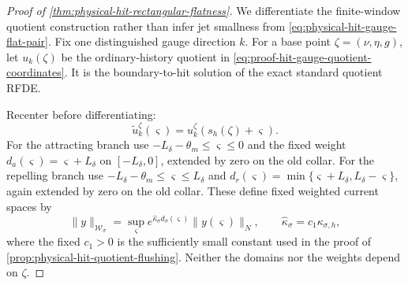 \begin{proof}[Proof of
\cref{thm:physical-hit-rectangular-flatness}]
We differentiate the finite-window quotient construction rather than infer
jet smallness from \cref{eq:physical-hit-gauge-flat-pair}.  Fix one
distinguished gauge direction $k$.  For a base point
\(\zeta=(\nu,\eta,g)\), let $u_k(\zeta)$ be the ordinary-history quotient
in \cref{eq:proof-hit-gauge-quotient-coordinates}.  It is the boundary-to-hit
solution of the exact standard quotient RFDE.

Recenter before differentiating:
\begin{equation}
 \widetilde u_k^\zeta(\varsigma)
 =u_k^\zeta(s_h(\zeta)+\varsigma).               \label{eq:proof-centered-gauge-quotient}
\end{equation}
For the attracting branch use $-L_\delta-\theta_m\le\varsigma\le0$
and the fixed weight
$d_a(\varsigma)=\varsigma+L_\delta$ on $[-L_\delta,0]$, extended by zero
on the old collar.  For the repelling branch use
$-L_\delta-\theta_m\le\varsigma\le L_\delta$ and
$d_r(\varsigma)=\min\{\varsigma+L_\delta,
L_\delta-\varsigma\}$, again extended by zero on the old collar.  These
define fixed weighted current spaces by
\begin{equation}
 \|y\|_{\mathcal W_\sigma}
 =\sup_{\varsigma}
    e^{\widehat\kappa_\sigma d_\sigma(\varsigma)}
       \|y(\varsigma)\|_N,
 \qquad
 \widehat\kappa_\sigma=c_1\kappa_{\sigma,h},     \label{eq:proof-centered-W-norm}
\end{equation}
where the fixed $c_1>0$ is the sufficiently small constant used in the
proof of \cref{prop:physical-hit-quotient-flushing}.  Neither the domains
nor the weights depend on $\zeta$.


\end{proof}
